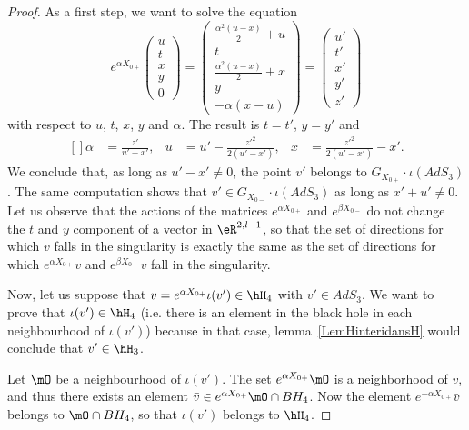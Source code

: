 	\begin{proof}
		As a first step, we want to solve the equation
		\begin{equation}
			e^{\alpha X_{0+}}\begin{pmatrix}
				u \\
				t \\
				x \\
				y \\
				0
			\end{pmatrix}=
			\begin{pmatrix}
				\frac{ \alpha^2(u-x) }{2}+u \\
				t                           \\
				\frac{ \alpha^2(u-x) }{2}+x \\
				y                           \\
				-\alpha(x-u)
			\end{pmatrix}=\begin{pmatrix}
				u' \\
				t' \\
				x' \\
				y' \\
				z'
			\end{pmatrix}
		\end{equation}
		with respect to $u$, $t$, $x$, $y$ and $\alpha$. The result is $t=t'$, $y=y'$ and
		\begin{equation}
			\begin{aligned}[]
				\alpha & =\frac{ z' }{ u'-x' }, & u & =u'-\frac{ z'^2 }{ 2(u'-x') }, & x & =\frac{ z'^2 }{ 2(u'-x') }-x'.
			\end{aligned}
		\end{equation}
		We conclude that, as long as $u'-x'\neq 0$, the point $v'$ belongs to $G_{X_{0+}}\cdot\iota(AdS_3)$. The same computation shows that $v'\in G_{X_{0-}}\cdot\iota(AdS_3)$ as long as $x'+u'\neq 0$. Let us observe that the actions of the matrices $ e^{\alpha X_{0+}}$ and $ e^{\beta X_{0-}}$ do not change the $t$ and $y$ component of a vector in $\eR^{2,l-1}$, so that the set of directions for which $v$ falls in the singularity is exactly the same as the set of directions for which $ e^{\alpha X_{0+}}v$ and $ e^{\beta X_{0-}}v$ fall in the singularity.

		Now, let us suppose that $v= e^{\alpha X_{0+}}\iota(v')\in\hH_4$ with $v'\in AdS_3$. We want to prove that $\iota(v')\in\hH_4$ (i.e. there is an element in the black hole in each neighbourhood of $\iota(v')$) because in that case, lemma~\ref{LemHinteridansH} would conclude that $v'\in\hH_3$.

		Let $\mO$ be a neighbourhood of $\iota(v')$. The set $ e^{\alpha X_{0+}}\mO$ is a neighborhood of $v$, and thus there exists an element $\bar v\in e^{\alpha X_{0+}}\mO\cap BH_4$. Now the element $ e^{-\alpha X_{0+}}\bar v$ belongs to $\mO\cap BH_4$, so that $\iota(v')$ belongs to $\hH_4$.
	\end{proof}

